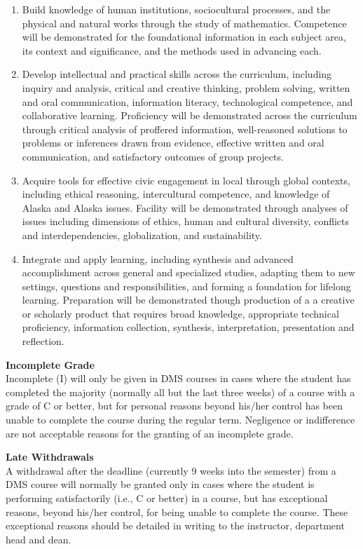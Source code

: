 \documentclass[12pt]{article}
\renewcommand{\emph}[1]{\textsf{\textbf{#1}}}
\newcommand{\localhead}[1]{\par\smallskip\textbf{#1}\nobreak\\}%
\def\subheading#1{\localhead{\emph{#1}}}
\begin{document}
\begin{enumerate}
\item Build knowledge of human institutions, sociocultural processes, and the physical and natural works through the study of mathematics.  Competence will be demonstrated for the foundational information in each subject area, its context and significance, and the methods used in advancing each.

\item Develop intellectual and practical skills across the curriculum, including inquiry and analysis, critical and creative thinking, problem solving, written and oral communication, information literacy, technological competence, and collaborative learning. Proficiency will be demonstrated across the curriculum through critical analysis of proffered information, well-reasoned solutions to problems or inferences drawn from evidence, effective written and oral communication, and satisfactory outcomes of group projects.

\item Acquire tools for effective civic engagement in local through global contexts, including ethical reasoning, intercultural competence, and knowledge of Alaska and Alaska issues.  Facility will be demonstrated through analyses of issues including dimensions of ethics, human and cultural diversity, conflicts and interdependencies, globalization, and sustainability.   

\item Integrate and apply learning, including synthesis and advanced accomplishment across general and specialized studies, adapting them to new settings, questions and responsibilities, and forming a foundation for lifelong learning. Preparation will be demonstrated though production of a a creative or scholarly product that requires broad knowledge, appropriate technical proficiency, information collection, synthesis, interpretation, presentation and reflection.
\end{enumerate}

\subheading{Incomplete Grade} 
Incomplete (I) will only be given in
  DMS courses in cases where
  the student has completed the majority (normally all but the last
  three weeks) of a course with a grade of C or better, but for
  personal reasons beyond his/her control has been unable to complete
  the course during the regular term. Negligence or indifference are
  not acceptable reasons for the granting of an incomplete
  grade. 

\subheading{Late Withdrawals} 
A withdrawal after the deadline
  (currently 9 weeks into the semester) from a DMS course will
  normally be granted only in cases where the student is performing
  satisfactorily (i.e., C or better) in a course, but has exceptional
  reasons, beyond his/her control, for being unable to complete the
  course. These exceptional reasons should be detailed in writing to
  the instructor, department head and dean.
\end{document}
